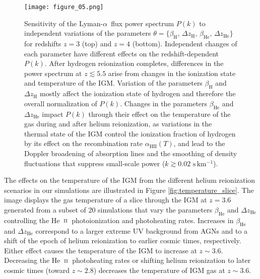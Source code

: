 \documentclass[twocolumn]{aastex62}
\newcommand\Lya{Lyman-$\alpha$}
\def\HeII{\hbox{He~$\scriptstyle\rm II$}}
\begin{document}
\begin{figure*}
\texttt{[image: figure\_05.png]}
\caption{Sensitivity of the \Lya\ flux power spectrum $P(k)$ to independent variations 
of the parameters 
$\theta= \{ \beta_{\mathrm{H}}, \,\Delta z_{\mathrm{H}}, \, \beta_{\mathrm{He}}, \,\Delta z_{\mathrm{He}} \} $ for redshifts $z=3$ (top) and $z=4$ (bottom). Independent 
changes of each parameter have different effects on the redshift-dependent $P(k)$. After hydrogen reionization completes,  differences in the power 
spectrum  at $z\lesssim 5.5$ arise from changes in the ionization state and temperature 
of the IGM. Variation of the parameters $\beta_\mathrm{H}$ and $\Delta z_\mathrm{H}$ mostly 
affect the ionization state of hydrogen and therefore the overall normalization of $P(k)$. 
Changes in the parameters $\beta_\mathrm{He}$ and $\Delta z_\mathrm{He}$ 
impact $P(k)$ through their effect on the temperature of the gas during and after helium reionization, as variations in the thermal state of the IGM control the ionization 
fraction of hydrogen by its effect on the recombination rate $\alpha_\mathrm{HII}(T)$, 
and lead to the Doppler broadening of absorption lines and the smoothing of 
density fluctuations that suppress small-scale power ($ k \gtrsim 0.02 \,\, \mathrm{s \, km^{-1}}$).}    
\label{fig:parameters_ps}
\end{figure*}


The effects on the temperature of the IGM from the different helium reionization scenarios in our simulations are illustrated in Figure \ref{fig:temperature_slice}. The image 
displays the gas temperature of a slice through the IGM at $z=3.6$ generated from a subset of 20 simulations that vary the parameters $\beta_{\mathrm{He}}$ and 
$\Delta z_{\mathrm{He}}$ 
controlling the \HeII\ photoionization and photoheating rates. 
Increases in $\beta_{\mathrm{He}}$ and $\Delta z_{\mathrm{He}}$ correspond to a larger 
extreme UV background from AGNs and to a shift of the epoch of helium reionization to earlier cosmic times, respectively. Either effect causes the temperature of the 
IGM to increase at $z \sim 3.6$. 
Decreasing the \HeII\ photoheating rates or shifting helium reionization to later cosmic times (toward $z\sim 2.8$) 
decreases the temperature of IGM gas at $z\sim 3.6$. 
\end{document}
